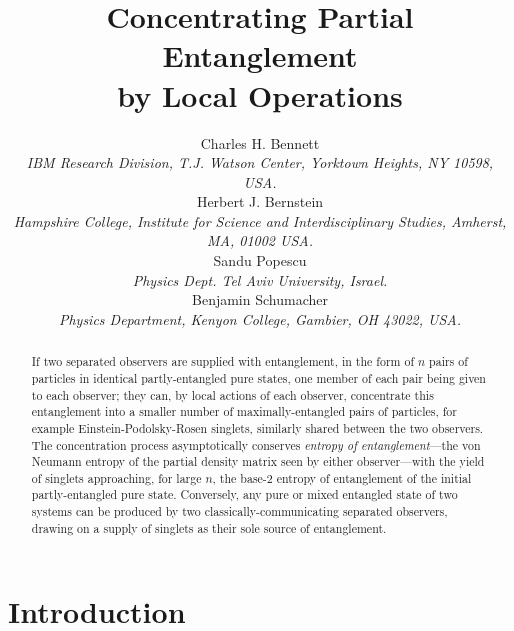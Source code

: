 \raggedbottom



\title{Concentrating Partial Entanglement \\ by Local Operations}
\author{Charles H. Bennett \\
{\protect\small\sl IBM Research Division, T.J. Watson Center,
Yorktown Heights, NY 10598, USA.} \\
Herbert J. Bernstein \\
{\protect\small\sl Hampshire College, Institute for Science and
Interdisciplinary Studies,
Amherst, MA, 01002 USA.} \\
Sandu Popescu \\
{\protect\small\sl
Physics Dept. Tel Aviv University, Israel.} \\
Benjamin Schumacher \\
{\protect\small\sl Physics Department, Kenyon College, Gambier,
OH 43022, USA.}}
 
\begin{abstract}
If two separated observers are supplied with entanglement, in the form
of $n$ pairs of particles in identical partly-entangled pure states,
one member of each pair being given to each observer; they can, by
local actions of each observer, concentrate this entanglement into
a smaller number of maximally-entangled pairs of particles,
for example Einstein-Podolsky-Rosen singlets, similarly shared between
the two observers.  The concentration process asymptotically
conserves {\em entropy of entanglement}---the von Neumann entropy of
the partial density matrix seen by either observer---with the yield of
singlets approaching, for large $n$, the base-2 entropy of
entanglement of the initial partly-entangled pure state.  Conversely,
any pure or mixed entangled state of two systems can be produced by
two classically-communicating separated observers, drawing on a
supply of singlets as their sole source of entanglement.
\end{abstract}

\maketitle

\newpage
\section{Introduction}
 
